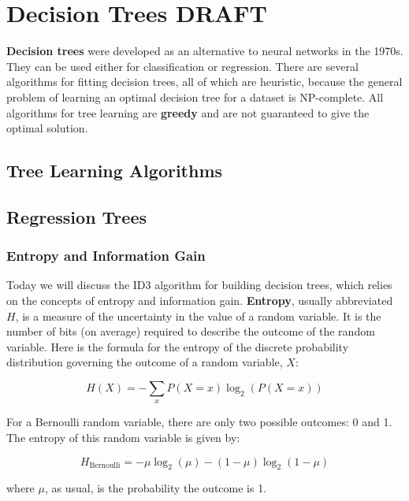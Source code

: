 \chapter{Decision Trees {\color{red} DRAFT} \label{chapter:decisiontrees}}

{\bf Decision trees} were developed as an alternative to neural networks in the 1970s. They can be used either for classification or regression. There are several algorithms for fitting decision trees, all of which are heuristic, because the general problem of learning an optimal decision tree for a dataset is NP-complete. All algorithms for tree learning are \textbf{greedy} and are not guaranteed to give the optimal solution.


\section{Tree Learning Algorithms}

\section{Regression Trees}


\subsection{Entropy and Information Gain}

Today we will discuss the ID3 algorithm for building decision trees, which relies on the concepts of entropy and information gain. \textbf{Entropy}, usually abbreviated $H$, is a measure of the uncertainty in the value of a random variable. It is the number of bits (on average) required to describe the outcome of the random variable. Here is the formula for the entropy of the discrete probability distribution governing the outcome of a random variable, $X$:

$$ H(X) = - \sum_{x} P(X = x) \log_2\left(P(X = x)\right) $$

For a Bernoulli random variable, there are only two possible outcomes: 0 and 1. The entropy of this random variable is given by:

$$ H_\text{Bernoulli} = -\mu \log_2(\mu) - (1 - \mu) \log_2 (1 - \mu) $$

where $\mu$, as usual, is the probability the outcome is 1. 

